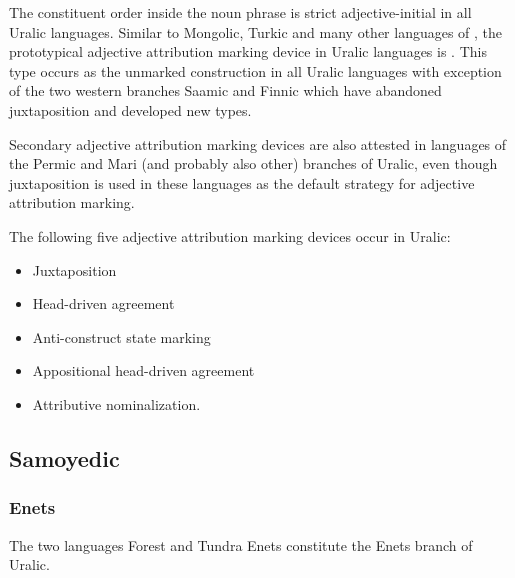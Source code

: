 The constituent order inside the noun phrase is strict adjective-initial in all Uralic languages. Similar to Mongolic, Turkic and many other languages of , the prototypical adjective attribution marking device in Uralic languages is . This type occurs as the unmarked construction in all Uralic languages with exception of the two western branches Saamic and Finnic which have abandoned juxtaposition and developed new types.

Secondary adjective attribution marking devices are also attested in languages of the Permic and Mari (and probably also other) branches of Uralic, even though juxtaposition is used in these languages as the default strategy for adjective attribution marking.

The following five adjective attribution marking devices occur in Uralic:
\begin{itemize}
\item Juxtaposition
\item Head\hyp{}driven agreement
\item Anti\hyp{}construct state marking
\item Appositional head\hyp{}driven agreement
\item Attributive nominalization.
\end{itemize}

\subsection{Samoyedic}
\subsubsection{Enets}
The two languages Forest and Tundra Enets constitute the Enets branch of Uralic.

